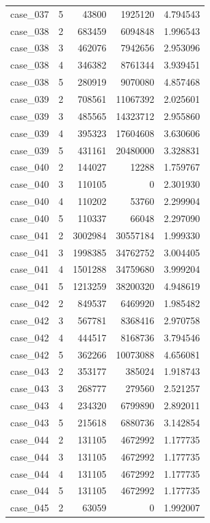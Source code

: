 \begin{longtable}{lrrrr}
case\_037 & 5 & 43800 & 1925120 & 4.794543 \\
case\_038 & 2 & 683459 & 6094848 & 1.996543 \\
case\_038 & 3 & 462076 & 7942656 & 2.953096 \\
case\_038 & 4 & 346382 & 8761344 & 3.939451 \\
case\_038 & 5 & 280919 & 9070080 & 4.857468 \\
case\_039 & 2 & 708561 & 11067392 & 2.025601 \\
case\_039 & 3 & 485565 & 14323712 & 2.955860 \\
case\_039 & 4 & 395323 & 17604608 & 3.630606 \\
case\_039 & 5 & 431161 & 20480000 & 3.328831 \\
case\_040 & 2 & 144027 & 12288 & 1.759767 \\
case\_040 & 3 & 110105 & 0 & 2.301930 \\
case\_040 & 4 & 110202 & 53760 & 2.299904 \\
case\_040 & 5 & 110337 & 66048 & 2.297090 \\
case\_041 & 2 & 3002984 & 30557184 & 1.999330 \\
case\_041 & 3 & 1998385 & 34762752 & 3.004405 \\
case\_041 & 4 & 1501288 & 34759680 & 3.999204 \\
case\_041 & 5 & 1213259 & 38200320 & 4.948619 \\
case\_042 & 2 & 849537 & 6469920 & 1.985482 \\
case\_042 & 3 & 567781 & 8368416 & 2.970758 \\
case\_042 & 4 & 444517 & 8168736 & 3.794546 \\
case\_042 & 5 & 362266 & 10073088 & 4.656081 \\
case\_043 & 2 & 353177 & 385024 & 1.918743 \\
case\_043 & 3 & 268777 & 279560 & 2.521257 \\
case\_043 & 4 & 234320 & 6799890 & 2.892011 \\
case\_043 & 5 & 215618 & 6880736 & 3.142854 \\
case\_044 & 2 & 131105 & 4672992 & 1.177735 \\
case\_044 & 3 & 131105 & 4672992 & 1.177735 \\
case\_044 & 4 & 131105 & 4672992 & 1.177735 \\
case\_044 & 5 & 131105 & 4672992 & 1.177735 \\
case\_045 & 2 & 63059 & 0 & 1.992007 \\

\end{longtable}
